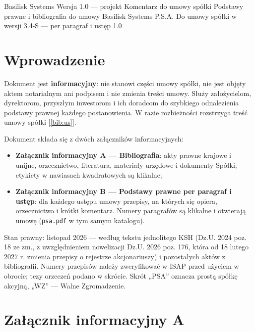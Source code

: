 \documentclass[11pt,a4paper]{report}
\newcommand{\Zr}[1]{[\ref{bib:#1}]}
\begin{document}
\BusinessPlanTitlePage
  {Basilisk Systems}
  {Wersja 1.0 --- projekt}
  {Komentarz do umowy spółki}
  {Podstawy prawne i bibliografia do umowy Basilisk Systems P.S.A.}
  {Do umowy spółki w wersji 3.4-S --- per paragraf i ustęp}
  {1.0}

\tableofcontents
\newpage

\chapter*{Wprowadzenie}

Dokument jest \textbf{informacyjny}: nie stanowi części umowy spółki, nie jest objęty aktem notarialnym ani podpisem i nie zmienia treści umowy. Służy założycielom, dyrektorom, przyszłym inwestorom i ich doradcom do szybkiego odnalezienia podstawy prawnej każdego postanowienia. W razie rozbieżności rozstrzyga treść umowy spółki \Zr{us}.

Dokument składa się z dwóch załączników informacyjnych:
\begin{itemize}
  \item \textbf{Załącznik informacyjny A --- Bibliografia}: akty prawne krajowe i unijne, orzecznictwo, literatura, materiały urzędowe i dokumenty Spółki; etykiety w nawiasach kwadratowych są klikalne;
  \item \textbf{Załącznik informacyjny B --- Podstawy prawne per paragraf i ustęp}: dla każdego ustępu umowy przepisy, na których się opiera, orzecznictwo i krótki komentarz. Numery paragrafów są klikalne i otwierają umowę (\texttt{psa.pdf} w tym samym katalogu).
\end{itemize}

Stan prawny: listopad 2026 --- według tekstu jednolitego KSH (Dz.U. 2024 poz. 18 ze zm., z uwzględnieniem nowelizacji Dz.U. 2026 poz. 176, która od 18 lutego 2027 r. zmienia przepisy o rejestrze akcjonariuszy) i pozostałych aktów z bibliografii. Numery przepisów należy zweryfikować w ISAP przed użyciem w obrocie; tezy orzeczeń podano w skrócie. Skrót „PSA” oznacza prostą spółkę akcyjną, „WZ” --- Walne Zgromadzenie.

\chapter*{Załącznik informacyjny A}

\end{document}
